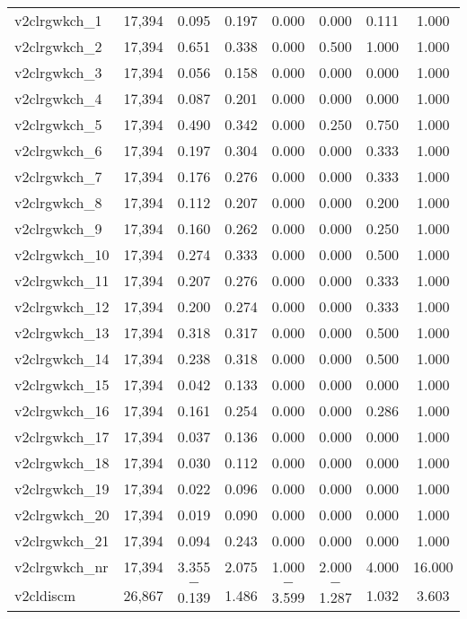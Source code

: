 \begin{table}[!htbp]
\begin{tabular}{@{\extracolsep{5pt}}lccccccc}
v2clrgwkch\_1 & 17,394 & 0.095 & 0.197 & 0.000 & 0.000 & 0.111 & 1.000 \\ 
v2clrgwkch\_2 & 17,394 & 0.651 & 0.338 & 0.000 & 0.500 & 1.000 & 1.000 \\ 
v2clrgwkch\_3 & 17,394 & 0.056 & 0.158 & 0.000 & 0.000 & 0.000 & 1.000 \\ 
v2clrgwkch\_4 & 17,394 & 0.087 & 0.201 & 0.000 & 0.000 & 0.000 & 1.000 \\ 
v2clrgwkch\_5 & 17,394 & 0.490 & 0.342 & 0.000 & 0.250 & 0.750 & 1.000 \\ 
v2clrgwkch\_6 & 17,394 & 0.197 & 0.304 & 0.000 & 0.000 & 0.333 & 1.000 \\ 
v2clrgwkch\_7 & 17,394 & 0.176 & 0.276 & 0.000 & 0.000 & 0.333 & 1.000 \\ 
v2clrgwkch\_8 & 17,394 & 0.112 & 0.207 & 0.000 & 0.000 & 0.200 & 1.000 \\ 
v2clrgwkch\_9 & 17,394 & 0.160 & 0.262 & 0.000 & 0.000 & 0.250 & 1.000 \\ 
v2clrgwkch\_10 & 17,394 & 0.274 & 0.333 & 0.000 & 0.000 & 0.500 & 1.000 \\ 
v2clrgwkch\_11 & 17,394 & 0.207 & 0.276 & 0.000 & 0.000 & 0.333 & 1.000 \\ 
v2clrgwkch\_12 & 17,394 & 0.200 & 0.274 & 0.000 & 0.000 & 0.333 & 1.000 \\ 
v2clrgwkch\_13 & 17,394 & 0.318 & 0.317 & 0.000 & 0.000 & 0.500 & 1.000 \\ 
v2clrgwkch\_14 & 17,394 & 0.238 & 0.318 & 0.000 & 0.000 & 0.500 & 1.000 \\ 
v2clrgwkch\_15 & 17,394 & 0.042 & 0.133 & 0.000 & 0.000 & 0.000 & 1.000 \\ 
v2clrgwkch\_16 & 17,394 & 0.161 & 0.254 & 0.000 & 0.000 & 0.286 & 1.000 \\ 
v2clrgwkch\_17 & 17,394 & 0.037 & 0.136 & 0.000 & 0.000 & 0.000 & 1.000 \\ 
v2clrgwkch\_18 & 17,394 & 0.030 & 0.112 & 0.000 & 0.000 & 0.000 & 1.000 \\ 
v2clrgwkch\_19 & 17,394 & 0.022 & 0.096 & 0.000 & 0.000 & 0.000 & 1.000 \\ 
v2clrgwkch\_20 & 17,394 & 0.019 & 0.090 & 0.000 & 0.000 & 0.000 & 1.000 \\ 
v2clrgwkch\_21 & 17,394 & 0.094 & 0.243 & 0.000 & 0.000 & 0.000 & 1.000 \\ 
v2clrgwkch\_nr & 17,394 & 3.355 & 2.075 & 1.000 & 2.000 & 4.000 & 16.000 \\ 
v2cldiscm & 26,867 & $-$0.139 & 1.486 & $-$3.599 & $-$1.287 & 1.032 & 3.603 \\ 

\end{tabular}
\end{table}

